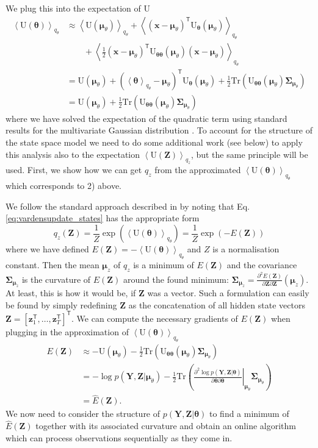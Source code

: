 \documentclass[a4paper,10pt]{article}
\newcommand{\bs}[1]{\mathbf{#1}}					%
\newcommand{\bgs}[1]{\boldsymbol{#1}}				%
\newcommand{\ppd}[3]{\frac{\partial^2 #1}{\partial #2 \partial #3}} %
\newcommand{\tr}{\mathsf{T}}				%
\newcommand{\eq}[1]{\begin{equation} #1 \end{equation}}%
\newcommand{\trace}[1]{\mathrm{Tr}\left(#1\right)}					%
\renewcommand{\ss}{z}         %
\newcommand{\sh}{x}         %
\newcommand{\spm}{\mu}    %
\renewcommand{\sp}{\theta}    %
\newcommand{\ps}{\bs{\ss}}    %
\newcommand{\ph}{\bs{\sh}}    %
\newcommand{\ppm}{\bgs{\spm}}   %
\newcommand{\pp}{\bgs{\sp}} %
\newcommand{\Ps}{\bs{Z}}    %
\newcommand{\Po}{\bs{Y}}    %
\newcommand{\E}[2][]{\left\langle #2 \right\rangle_{#1}}	%
\newcommand{\U}{\mathrm{U}}			%
\newcommand{\Cov}{\bgs{\Sigma}}			%
\begin{document}
We plug this into the expectation of $\U$
\begin{align}
    \E[q_\sp]{\U(\pp)} &\approx 
            \E[q_\sp]{\U(\ppm_\sp)} + \E[q_\sp]{(\ph - \ppm_\sp)^\tr \U_{\pp}(\ppm_\sp)}\nonumber\\
               & \qquad + \E[q_\sp]{\frac{1}{2}(\ph - \ppm_\sp)^\tr \U_{\pp\pp}(\ppm_\sp) (\ph - \ppm_\sp)}\\
        &= \U(\ppm_\sp) + \left(\E[q_\sp]{\pp} - \ppm_\sp\right)^\tr \U_{\pp}(\ppm_\sp) + \frac{1}{2}\trace{\U_{\pp\pp}(\ppm_\sp)\Cov_{\ppm_\sp}}\\
        &= \U(\ppm_\sp) + \frac{1}{2}\trace{\U_{\pp\pp}(\ppm_\sp)\Cov_{\ppm_\sp}}
\end{align}
where we have solved the expectation of the quadratic term using standard results for the multivariate Gaussian distribution \citep[][eq. (357)]{Petersen2008}. To account for the structure of the state space model we need to do some additional work (see below) to apply this analysis also to the expectation $\E[q_\ss]{\U(\Ps)}$, but the same principle will be used. First, we show how we can get $q_\ss$ from the approximated $\E[q_\sp]{\U(\pp)}$ which corresponds to 2) above.

We follow the standard approach described in \cite[p. 255]{Murphy2012} by noting that Eq. \ref{eq:vardensupdate_states} has the appropriate form
\eq{
    q_{\ss}(\Ps) = \frac{1}{Z}\exp\left(\E[q_\sp]{\U(\pp)}\right) = \frac{1}{Z}\exp\left(-E(\Ps)\right)
}
where we have defined $E(\Ps) = -\E[q_\sp]{\U(\pp)}$ and $Z$ is a normalisation constant. Then the mean $\ppm_\ss$ of $q_\ss$ is a minimum of $E(\Ps)$ and the covariance $\Cov_{\ppm_\ss}$ is the curvature of $E(\Ps)$ around the found minimum: $\Cov_{\ppm_\ss} = \ppd{E(\Ps)}{\Ps}{\Ps}(\ppm_\ss)$. At least, this is how it would be, if $\Ps$ was a vector. Such a formulation can easily be found by simply redefining $\Ps$ as the concatenation of all hidden state vectors $\Ps = [\ps_1^\tr, \dots, \ps_T^\tr]^\tr$. We can compute the necessary gradients of $E(\Ps)$ when plugging in the approximation of $\E[q_\sp]{\U(\pp)}$
\begin{align}
    E(\Ps) &\approx - \U(\ppm_\sp) - \frac{1}{2}\trace{\U_{\pp\pp}(\ppm_\sp)\Cov_{\ppm_\sp}}\\
    \label{eq:stateenergy} &= - \log p(\Po,\Ps|\ppm_\sp) - \frac{1}{2}\trace{\left.\ppd{\log p(\Po,\Ps|\pp)}{\pp}{\pp}\right|_{\ppm_\sp}\Cov_{\ppm_\sp}}\\
    &= \hat{E}(\Ps).
\end{align}
We now need to consider the structure of $p(\Po,\Ps|\pp)$ to find a minimum of $\hat{E}(\Ps)$ together with its associated curvature and obtain an online algorithm which can process observations sequentially as they come in.
\end{document}
